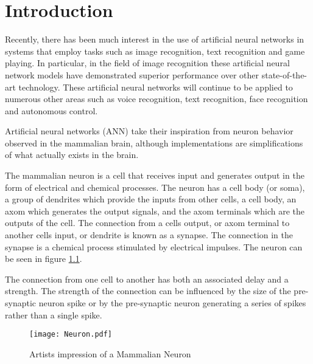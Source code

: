 
\chapter{Introduction}
\label{sec:chap-one}

Recently, there has been much interest in the use of artificial neural networks in systems that employ tasks such as image recognition\cite{krizhevsky2012imagenet}, text recognition\cite{qiu2013parallel} and game playing\cite{maddison2014move}.
In particular, in the field of image recognition these artificial neural network models have demonstrated superior performance
over other state-of-the-art technology\cite{krizhevsky2012imagenet}.
These artificial neural networks will continue to be applied to numerous other areas such as voice recognition, text recognition, 
face recognition and autonomous control.

Artificial neural networks (ANN) take their inspiration from neuron behavior observed in the mammalian brain, although implementations are simplifications of what actually exists in the brain.

The mammalian neuron is a cell that receives input and generates output in the form of electrical and chemical processes.
The neuron has a cell body (or soma), a group of dendrites which provide the inputs from other cells, a cell body, an axom which generates the output signals, and the axom terminals which are the outputs of the cell.
The connection from a cells output, or axom terminal to another cells input, or dendrite is known as a synapse. 
The connection in the synapse is a chemical process stimulated by electrical impulses.
The neuron can be seen in figure \ref{fig:neuron}.

The connection from one cell to another has both an associated delay and a strength. The strength of the connection can be influenced by the size of the pre-synaptic neuron spike or by the pre-synaptic neuron generating a series of spikes rather than a single spike.

\begin{figure}[!t]
\centering
\captionsetup{justification=centering}
\captionsetup{width=.9\linewidth}
\centerline{
\mbox{\texttt{[image: Neuron.pdf]}}
}
\caption{Artists impression of a Mammalian Neuron}
\label{fig:neuron}
\end{figure}




